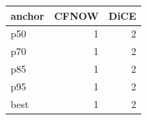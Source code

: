 \begin{tabular}{lrr}
\toprule
anchor &  CFNOW &  DiCE \\
\midrule
   p50 &      1 &     2 \\
   p70 &      1 &     2 \\
   p85 &      1 &     2 \\
   p95 &      1 &     2 \\
  best &      1 &     2 \\
\bottomrule
\end{tabular}
